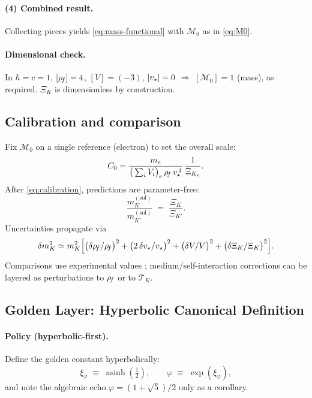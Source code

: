 \paragraph{(4) Combined result.}
Collecting pieces yields \eqref{eq:mass-functional} with \(\mathcal{M}_0\) as in \eqref{eq:M0}.

\paragraph{Dimensional check.}
In \(\hbar=c=1\), \([\rho_{\!f}]=4\), \([V]=(-3)\), \([v_\star]=0\) \(\Rightarrow\) \([\mathcal{M}_0]=1\) (mass), as required. \(\Xi_K\) is dimensionless by construction.

\subsection{Calibration and comparison}

Fix \(\mathcal{M}_0\) on a single reference (electron) to set the overall scale:
\begin{equation}
	C_0
	= \frac{m_e}{\big(\sum_i V_i\big)_e \,\rho_{\!f} \,v_\star^{\,2}}\,
	\frac{1}{\Xi_{K_e}} .
	\label{eq:calibration}
\end{equation}
After \eqref{eq:calibration}, predictions are parameter-free:
\[
	\frac{m_K^{(\mathrm{sol})}}{m_{K'}^{(\mathrm{sol})}}
	\;=\; \frac{\Xi_K}{\Xi_{K'}}.
\]
Uncertainties propagate via
\begin{equation}
	\delta m_K^2 \simeq m_K^2\Big[
		\big(\delta\rho_{\!f}/\rho_{\!f}\big)^2
		+ \big(2\,\delta v_\star/v_\star\big)^2
		+ \big(\delta V/V\big)^2
		+ \big(\delta\Xi_K/\Xi_K\big)^2
		\Big].
\end{equation}
Comparisons use experimental values \cite{PDG2024}; medium/self-interaction corrections can be layered as perturbations to \(\rho_{\!f}\) or to \(\mathcal{T}_K\).

\subsection{Golden Layer: Hyperbolic Canonical Definition}
\label{sec:golden_layer}

\paragraph*{Policy (hyperbolic-first).}
Define the golden constant hyperbolically:
\[
	\xi_\varphi \;\equiv\; \operatorname{asinh}\!\left(\tfrac{1}{2}\right),
	\qquad
	\varphi \;\equiv\; \exp(\xi_\varphi),
\]
and note the algebraic echo \(\varphi=(1+\sqrt5)/2\) only as a corollary.

